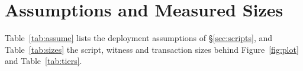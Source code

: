 \section{Assumptions and Measured Sizes}\label{app:short}

Table~\ref{tab:assume} lists the deployment assumptions of
\S\ref{sec:scripts}, and Table~\ref{tab:sizes} the script, witness and
transaction sizes behind Figure~\ref{fig:plot} and
Table~\ref{tab:tiers}.



